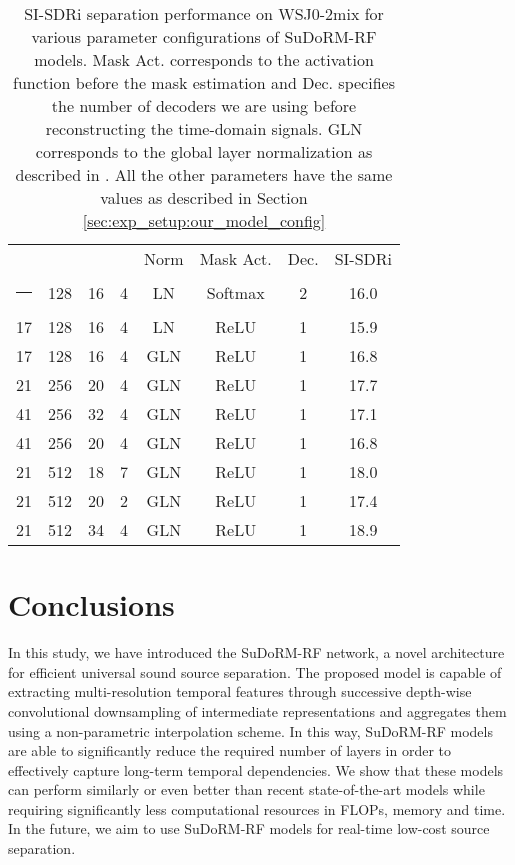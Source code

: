 \documentclass{article}
\makeatletter
\def\hlinewd#1{\noalign{\ifnum0=`}\fi\hrule \@height #1 \futurelet
   \reserved@a\@xhline}
\theoremstyle{definition}
\newcommand{\sudo}{SuDoRM-RF }
\makeatother
\begin{document}
\begin{table}[!t]
    \centering
    \begin{tabular}{c|c|c|c|c|c|c|c}
\toprule
 &  &  &  & Norm & Mask Act. & Dec. & SI-SDRi \\
\hlinewd{1pt}
21 & 128 & 16 & 4 & LN & Softmax & 2 & 16.0 \\
\hline
17 & 128 & 16 & 4& LN & ReLU & 1 & 15.9 \\
\hline
17 & 128 & 16 & 4& GLN & ReLU & 1 & 16.8 \\
\hline
21 & 256 & 20 & 4& GLN & ReLU & 1 & 17.7 \\
\hline
41 & 256 & 32 & 4 & GLN & ReLU & 1 & 17.1 \\
\hline
41 & 256 & 20 & 4 & GLN & ReLU & 1 & 16.8 \\
\hline
21 & 512 & 18 & 7 & GLN & ReLU & 1 & 18.0 \\
\hline
21 & 512 & 20 & 2 & GLN & ReLU & 1 & 17.4 \\
\hline
21 & 512 & 34 & 4 & GLN & ReLU & 1 & 18.9 \\
\bottomrule
\end{tabular}
\caption{SI-SDRi separation performance on WSJ0-2mix for various parameter configurations of \sudo models. Mask Act. corresponds to the activation function before the mask estimation and Dec. specifies the number of decoders we are using before reconstructing the time-domain signals. GLN corresponds to the global layer normalization as described in \cite{luo2019convTasNet}. All the other parameters have the same values as described in Section \ref{sec:exp_setup:our_model_config}}
\label{tab:ablation_study}
 \vspace{-10pt}
\end{table}


\section{Conclusions}
\label{sec:conclusions}
In this study, we have introduced the \sudo network, a novel architecture for efficient universal sound source separation. The proposed model is capable of extracting multi-resolution temporal features through successive depth-wise convolutional downsampling of intermediate representations and aggregates them using a non-parametric interpolation scheme. In this way, \sudo models are able to significantly reduce the required number of layers in order to effectively capture long-term temporal dependencies. We show that these models can perform similarly or even better than recent state-of-the-art models while requiring significantly less computational resources in FLOPs, memory and time. In the future, we aim to use \sudo models for real-time low-cost source separation.




\end{document}
